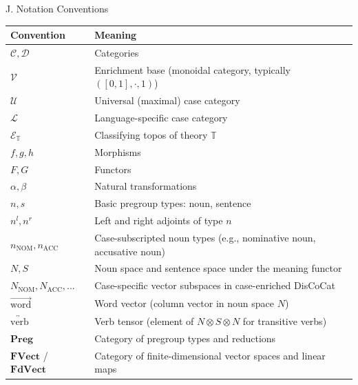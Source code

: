 \documentclass[
  ignorenonframetext,
]{beamer}
\newcounter{none} %
\begin{document}
\begin{frame}[fragile]{J. Notation Conventions}
\protect{}\label{j.-notation-conventions}
{\def\LTcaptype{none} %
\begin{longtable}[]{@{}
  >{\raggedright\arraybackslash}p{}
  >{\raggedright\arraybackslash}p{}@{}}
\toprule\noalign{}
\begin{minipage}[b]{\linewidth}\raggedright
Convention
\end{minipage} & \begin{minipage}[b]{\linewidth}\raggedright
Meaning
\end{minipage} \\
\midrule\noalign{}
\endhead
\(\mathcal{C}, \mathcal{D}\) & Categories \\
\(\mathcal{V}\) & Enrichment base (monoidal category, typically
\(([0,1], \cdot, 1)\)) \\
\(\mathcal{U}\) & Universal (maximal) case category \\
\(\mathcal{L}\) & Language-specific case category \\
\(\mathcal{E}_{\mathbb{T}}\) & Classifying topos of theory
\(\mathbb{T}\) \\
\(f, g, h\) & Morphisms \\
\(F, G\) & Functors \\
\(\alpha, \beta\) & Natural transformations \\
\(n, s\) & Basic pregroup types: noun, sentence \\
\(n^l, n^r\) & Left and right adjoints of type \(n\) \\
\(n_{\text{NOM}}, n_{\text{ACC}}\) & Case-subscripted noun types (e.g.,
nominative noun, accusative noun) \\
\(N, S\) & Noun space and sentence space under the meaning functor \\
\(N_{\text{NOM}}, N_{\text{ACC}}, \ldots\) & Case-specific vector
subspaces in case-enriched DisCoCat \\
\(\overrightarrow{\text{word}}\) & Word vector (column vector in noun
space \(N\)) \\
\(\overleftrightarrow{\text{verb}}\) & Verb tensor (element of
\(N \otimes S \otimes N\) for transitive verbs) \\
\(\mathbf{Preg}\) & Category of pregroup types and reductions \\
\(\mathbf{FVect}\) / \(\mathbf{FdVect}\) & Category of
finite-dimensional vector spaces and linear maps \\

\end{longtable}}
\end{frame}
\end{document}
